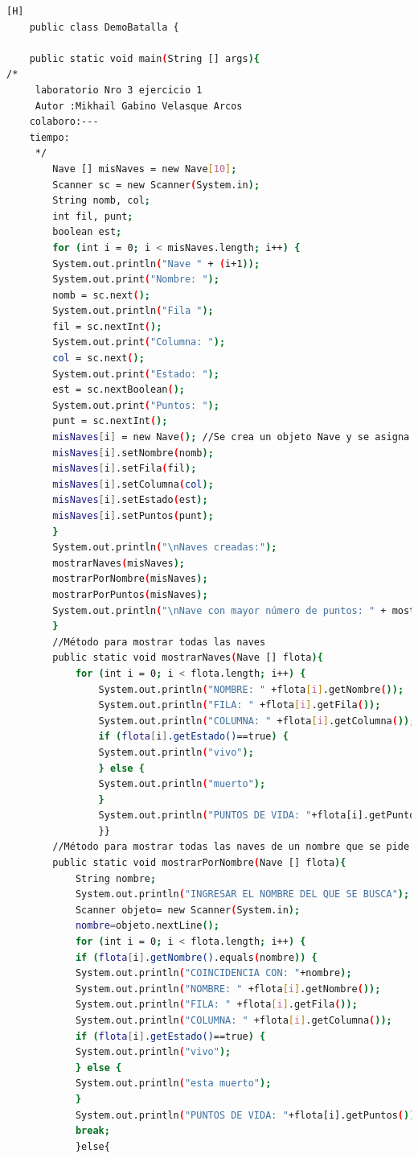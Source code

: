 \documentclass{article}
\begin{document}
	\begin{lstlisting}[language=bash,caption={Creando la clase principal de DemoBatalla_v2.java}][H]
	public class DemoBatalla {
	
	public static void main(String [] args){
/*
	 laboratorio Nro 3 ejercicio 1
	 Autor :Mikhail Gabino Velasque Arcos
	colaboro:---
	tiempo:
	 */	
		Nave [] misNaves = new Nave[10];
		Scanner sc = new Scanner(System.in);
		String nomb, col;
		int fil, punt;
		boolean est;
		for (int i = 0; i < misNaves.length; i++) {
		System.out.println("Nave " + (i+1));
		System.out.print("Nombre: ");
		nomb = sc.next();
		System.out.println("Fila ");
		fil = sc.nextInt();
		System.out.print("Columna: ");
		col = sc.next();
		System.out.print("Estado: ");
		est = sc.nextBoolean();
		System.out.print("Puntos: ");
		punt = sc.nextInt();
		misNaves[i] = new Nave(); //Se crea un objeto Nave y se asigna su referencia a misNaves
		misNaves[i].setNombre(nomb);
		misNaves[i].setFila(fil);
		misNaves[i].setColumna(col);
		misNaves[i].setEstado(est);
		misNaves[i].setPuntos(punt);
		}
		System.out.println("\nNaves creadas:");
		mostrarNaves(misNaves);
		mostrarPorNombre(misNaves);
		mostrarPorPuntos(misNaves);
		System.out.println("\nNave con mayor número de puntos: " + mostrarMayorPuntos(misNaves));
		}
		//Método para mostrar todas las naves
		public static void mostrarNaves(Nave [] flota){
			for (int i = 0; i < flota.length; i++) {
				System.out.println("NOMBRE: " +flota[i].getNombre());
				System.out.println("FILA: " +flota[i].getFila());
				System.out.println("COLUMNA: " +flota[i].getColumna());
				if (flota[i].getEstado()==true) {
				System.out.println("vivo");
				} else {
				System.out.println("muerto");
				}
				System.out.println("PUNTOS DE VIDA: "+flota[i].getPuntos());
				}}
		//Método para mostrar todas las naves de un nombre que se pide por teclado
		public static void mostrarPorNombre(Nave [] flota){
			String nombre;
			System.out.println("INGRESAR EL NOMBRE DEL QUE SE BUSCA");
			Scanner objeto= new Scanner(System.in);
			nombre=objeto.nextLine();
			for (int i = 0; i < flota.length; i++) {
			if (flota[i].getNombre().equals(nombre)) {
			System.out.println("COINCIDENCIA CON: "+nombre);
			System.out.println("NOMBRE: " +flota[i].getNombre());
			System.out.println("FILA: " +flota[i].getFila());
			System.out.println("COLUMNA: " +flota[i].getColumna());
			if (flota[i].getEstado()==true) {
			System.out.println("vivo");
			} else {
			System.out.println("esta muerto");
			}
			System.out.println("PUNTOS DE VIDA: "+flota[i].getPuntos());
			break;
			}else{

\end{lstlisting}
\end{document}
